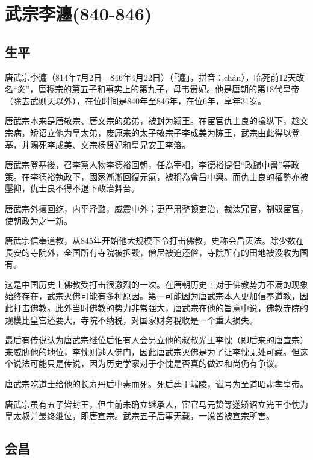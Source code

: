
\section{武宗李瀍\tiny(840-846)}

\subsection{生平}

唐武宗李瀍（814年7月2日－846年4月22日）（「瀍」，拼音：chán），临死前12天改名“炎”，唐穆宗的第五子和事实上的第九子，母韦贵妃。他是唐朝的第18代皇帝（除去武则天以外），在位时间是840年至846年，在位6年，享年31岁。

唐武宗本来是唐敬宗、唐文宗的弟弟，被封为颍王。在宦官仇士良的操纵下，趁文宗病，矫诏立他为皇太弟，废原来的太子敬宗子李成美为陈王，武宗由此得以登基，并赐死李成美、文宗杨贤妃和皇兄安王李溶。

唐武宗登基後，召李黨人物李德裕回朝，任為宰相，李德裕提倡“政歸中書”等政策。在李德裕執政下，國家漸漸回復元氣，被稱為會昌中興。而仇士良的權勢亦被壓抑，仇士良不得不退下政治舞台。

唐武宗外攘回纥，内平泽潞，威震中外；更严肃整顿吏治，裁汰冗官，制驭宦官，使朝政为之一新。

唐武宗信奉道教，从845年开始他大规模下令打击佛教，史称会昌灭法。除少数在長安的寺院外，全国所有寺院被拆毁，僧尼被迫还俗，寺院所有的田地被没收为国有。

这是中国历史上佛教受打击很激烈的一次。在唐朝历史上对于佛教势力不满的现象始终存在，武宗灭佛可能有多种原因。第一可能因为唐武宗本人更加信奉道教，因此打击佛教。此外当时佛教的势力非常强大，唐武宗在他的旨意中说，佛教寺院的规模比皇宫还要大，寺院不纳税，对国家财务稅收是一个重大损失。

最后有传说认为唐武宗继位后怕有人会另立他的叔叔光王李忱（即后来的唐宣宗）来威胁他的地位，李忱则逃入佛门，因此唐武宗灭佛是为了让李忱无处可藏。但这个说法可能只是传说，因为历史学家对于李忱是否真的做过和尚仍有争议。

唐武宗吃道士给他的长寿丹后中毒而死。死后葬于端陵，谥号为至道昭肃孝皇帝。

唐武宗虽有五子皆封王，但生前未确立继承人，宦官马元贽等遂矫诏立光王李忱为皇太叔并最终继位，即唐宣宗。武宗五子后事无载，一说皆被宣宗所害。


\subsection{会昌}

